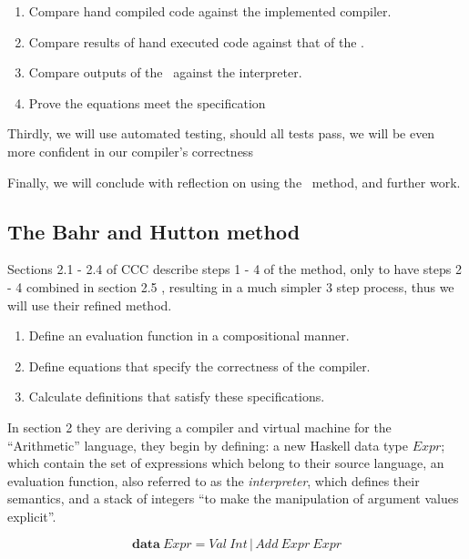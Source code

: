 \documentclass {article}
\begin{document}
\begin{enumerate}
	\item Compare hand compiled code against the
		implemented compiler.
	\item Compare results of hand executed code 
		against that of the \vm.
	\item Compare outputs of the \vm\ against the interpreter.
	\item Prove the equations meet the specification\cite[page 14]{bandh}
\end{enumerate}

Thirdly, we will use automated testing,
should all tests pass, we will
be even more confident in our 
compiler's correctness

Finally, we will conclude with 
reflection on using the \BH\ method,
and further work.




\subsection{The Bahr and Hutton method}

Sections 2.1 - 2.4 of CCC describe steps
1 - 4 of the method, only to have steps 2 - 4 combined
in section 2.5 \cite[2.5 Combining the transformation steps]{bandh},
resulting in a much simpler 3 step process, 
thus we will use their refined method\cite[page 12]{bandh}.

\begin{enumerate}
	\item Define an evaluation function
		in a compositional manner.
	\item Define equations that specify
		the correctness of the compiler.
	\item Calculate definitions that 
		satisfy these specifications.
\end{enumerate}

In section 2 they are deriving a compiler
and virtual machine for the ``Arithmetic'' language,
they begin by defining: a new Haskell data type $Expr$;
which contain the set of expressions which belong to their source language,
an evaluation function, also referred to as the \emph{interpreter},
which defines their semantics,
and a stack of integers 
``to make the manipulation of argument values explicit''.

	\[ \textbf{data} \  Expr = Val \ Int \, | \, Add \ Expr \ Expr\]
\end{document}
